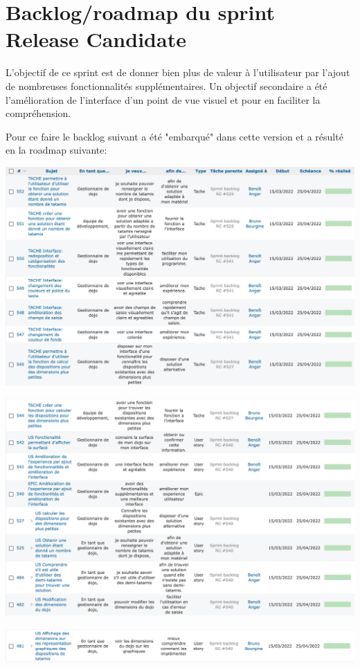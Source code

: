 \section{Backlog/roadmap du sprint Release Candidate}

L’objectif de ce sprint est de donner bien plus de valeur à l'utilisateur par l’ajout 
de nombreuses fonctionnalités supplémentaires. Un objectif secondaire a été l'amélioration 
de l’interface d’un point de vue visuel et pour en faciliter la compréhension. 

Pour ce faire le backlog suivant a été "embarqué" dans cette version et a résulté en la roadmap suivante:

\begin{center}
    \includegraphics[width=17cm]{images/roadmap-rc-part1.png}
\end{center}

\begin{center}
    \includegraphics[width=17cm]{images/roadmap-rc-part2.png}

    \includegraphics[width=17cm]{images/roadmap-rc-part3.png}
\end{center}


